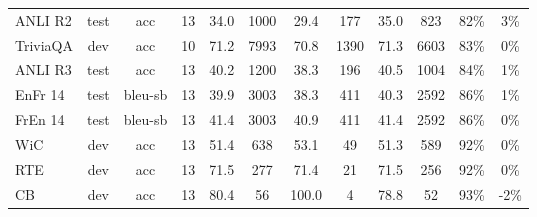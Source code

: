 \documentclass{article}
\begin{document}
\begin{table}
{\begin{adjustwidth}{-1.4in}{-1.4in}
\begin{center}
\begin{tabular}{lccccccccccc}
             ANLI R2 &  test &      acc &  13 &        34.0 &                      1000 &                            29.4 &                       177 &                            35.0 &                       823 &                            82\% &                                                 3\% \\
            TriviaQA &   dev &      acc &  10 &        71.2 &                      7993 &                            70.8 &                      1390 &                            71.3 &                      6603 &                            83\% &                                                 0\% \\
             ANLI R3 &  test &      acc &  13 &        40.2 &                      1200 &                            38.3 &                       196 &                            40.5 &                      1004 &                            84\% &                                                 1\% \\
        EnFr 14 &  test &  bleu-sb &  13 &        39.9 &                      3003 &                            38.3 &                       411 &                            40.3 &                      2592 &                            86\% &                                                 1\% \\
        FrEn 14 &  test &  bleu-sb &  13 &        41.4 &                      3003 &                            40.9 &                       411 &                            41.4 &                      2592 &                            86\% &                                                 0\% \\
                 WiC &   dev &      acc &  13 &        51.4 &                       638 &                            53.1 &                        49 &                            51.3 &                       589 &                            92\% &                                                 0\% \\
                 RTE &   dev &      acc &  13 &        71.5 &                       277 &                            71.4 &                        21 &                            71.5 &                       256 &                            92\% &                                                 0\% \\
                  CB &   dev &      acc &  13 &        80.4 &                        56 &                           100.0 &                         4 &                            78.8 &                        52 &                            93\% &                                                -2\% \\

\end{tabular}
\end{center}
\end{adjustwidth}}
\end{table}
\end{document}
